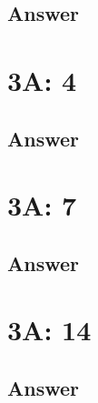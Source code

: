 \documentclass[
	12pt, %
]{fphw}
\newcommand\0{\mathbf{0}}
\newcommand\qed{\text{$\blacksquare$}}
\begin{document}
\subsection*{Answer} 
\qed


\section*{3A: 4}

\begin{problem}

\end{problem}

\subsection*{Answer}
\qed


\section*{3A: 7}

\begin{problem}

\end{problem}

\subsection*{Answer} 
\qed


\section*{3A: 14}

\begin{problem}

\end{problem}

\subsection*{Answer} 
\qed

\end{document}
